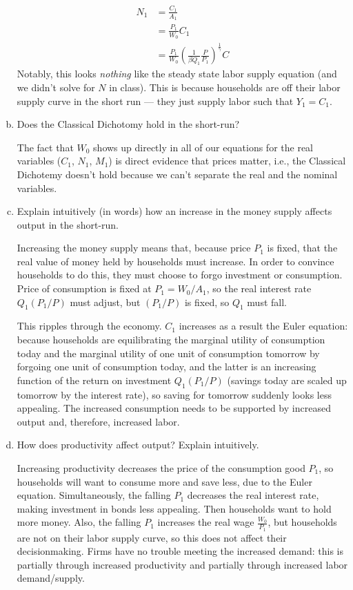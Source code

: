 \documentclass[answers]{exam}
\newcommand{\1}{\mathbf{1}}
\begin{document}
\begin{enumerate}[(a)]
\begin{solution}
        \begin{align*}
            N_1 & = \frac{C_1}{A_1} \\
            & = \frac{P_1}{W_0} C_1 \\
            &=\frac{P_1}{W_0} \left(\frac{1}{\beta Q_1} \frac{P}{P_1}\right)^{\frac{1}{\gamma}} C
        \end{align*}
        Notably, this looks \textit{nothing} like the steady state labor supply equation (and we didn't solve for $N$ in class). This is because households are off their labor supply curve in the short run --- they just supply labor such that $Y_1 = C_1$.
    \end{solution}
	\item Does the Classical Dichotomy hold in the short-run? 
	\begin{solution}
        The fact that $W_0$ shows up directly in all of our equations for the real variables ($C_1$, $N_1$, $M_1$) is direct evidence that prices matter, i.e., the Classical Dichotemy doesn't hold because we can't separate the real and the nominal variables.
    \end{solution}
	\item Explain intuitively (in words) how an increase in the money supply affects output in the short-run.
	\begin{solution}
        Increasing the money supply means that, because price $P_1$ is fixed, that the real value of money held by households must increase. In order to convince households to do this, they must choose to forgo investment or consumption. Price of consumption is fixed at $P_1 = W_0 / A_1$, so the real interest rate $Q_1 (P_1 / P)$ must adjust, but $(P_1 / P)$ is fixed, so $Q_1$ must fall.
        
        This ripples through the economy. $C_1$ increases as a result the Euler equation: because households are equilibrating the marginal utility of consumption today and the marginal utility of one unit of consumption tomorrow by forgoing one unit of consumption today, and the latter is an increasing function of the return on investment $Q_1(P_1 / P)$ (savings today are scaled up tomorrow by the interest rate), so saving for tomorrow suddenly looks less appealing. The increased consumption needs to be supported by increased output and, therefore, increased labor.
    \end{solution}
	\item How does productivity affect output? Explain intuitively.
	\begin{solution}
        Increasing productivity decreases the price of the consumption good $P_1$, so households will want to consume more and save less, due to the Euler equation. Simultaneously, the falling $P_1$ decreases the real interest rate, making investment in bonds less appealing. Then households want to hold more money. Also, the falling $P_1$ increases the real wage $\frac{W_0}{P_1}$, but households are not on their labor supply curve, so this does not affect their decisionmaking. Firms have no trouble meeting the increased demand: this is partially through increased productivity and partially through increased labor demand/supply.
        

\end{solution}
\end{enumerate}
\end{document}
